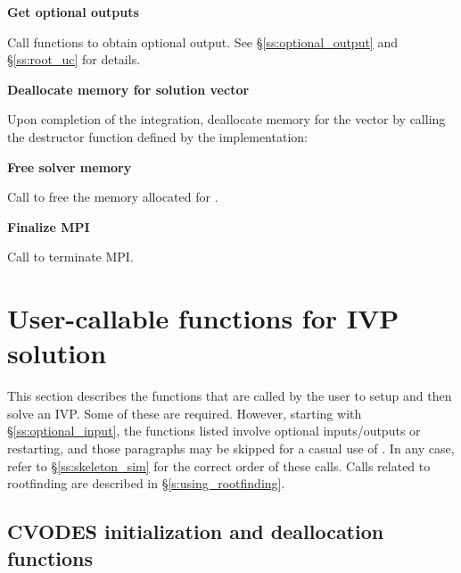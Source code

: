 \begin{Steps}
\item
  {\bf Get optional outputs}

  Call  functions to obtain optional output.
  See \S\ref{ss:optional_output} and \S\ref{ss:root_uc} for details.

\item
  {\bf Deallocate memory for solution vector}

  Upon completion of the integration, deallocate memory for the vector 
  by calling the destructor function defined by the {\nvector} implementation:

  {\s} 

  {\p} 
  
\item
  {\bf Free solver memory}

  Call  to free the memory allocated for {\cvodes}.
  
\item 
  {\bf {\p} Finalize MPI}

  Call  to terminate MPI.
  
\end{Steps}

\section{User-callable functions for IVP solution}
\label{ss:cvodes_fct_sim}

This section describes the {\cvodes} functions that are called by the
user to setup and then solve an IVP. Some of these are required. However,
starting with \S\ref{ss:optional_input}, the functions listed involve
optional inputs/outputs or restarting, and those paragraphs may be
skipped for a casual use of {\cvodes}. In any case, refer to
\S\ref{ss:skeleton_sim} for the correct order of these calls.
Calls related to rootfinding are described in \S\ref{s:using_rootfinding}.

\subsection{CVODES initialization and deallocation functions}
\label{sss:cvodemalloc}

